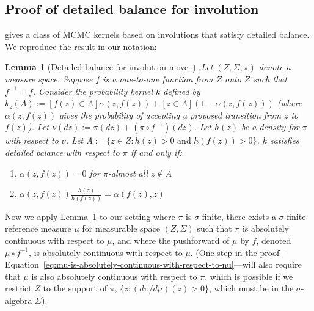 \documentclass[twoside]{article}
\newtheorem{lemma}[theorem]{Lemma}
\begin{document}
\subsection{Proof of detailed balance for involution} \label{sec:involution-detailed-balance}
\citet{tierney1998note} gives a class of MCMC kernels based on involutions that satisfy detailed balance.
We reproduce the result in our notation:
\begin{lemma}[Detailed balance for involution move~\citep{tierney1998note}] \label{lemma:tierney-involution}
Let $(Z, \Sigma, \pi)$ denote a measure space.
Suppose $f$ is a one-to-one function from $Z$ onto $Z$ such that $f^{-1} = f$.
Consider the probability kernel $k$ defined by $k_z(A) := [f(z) \in A] \alpha(z, f(z)) + [z \in A] (1 - \alpha(z, f(z)))$ (where $\alpha(z, f(z))$ gives the probability of accepting a proposed transition from $z$ to $f(z)$).
Let $\nu(dz) := \pi(dz) + (\pi \circ f^{-1})(dz)$.
Let $h(z)$ be a density for $\pi$ with respect to $\nu$.
Let $A := \{z \in Z : h(z) > 0 \mbox{ and } h(f(z)) > 0\}$.
$k$ satisfies detailed balance with respect to $\pi$ if and only if:
\begin{enumerate}
\item $\alpha(z, f(z)) = 0$ for $\pi$-almost all $z \not \in A$
\item $\alpha(z, f(z)) \frac{h(z)}{h(f(z))} = \alpha(f(z), z)$
\end{enumerate}
\end{lemma}

Now we apply Lemma~\ref{lemma:tierney-involution} to our setting where $\pi$ is $\sigma$-finite, there exists a $\sigma$-finite reference measure $\mu$ for measurable space $(Z, \Sigma)$ such that $\pi$ is absolutely continuous with respect to $\mu$, and where the pushforward of $\mu$ by $f$, denoted $\mu \circ f^{-1}$, is absolutely continuous with respect to $\mu$.
(One step in the proof---Equation~\ref{eq:mu-is-absolutely-continuous-with-respect-to-nu}---will also require that $\mu$ is also absolutely continuous with respect to $\pi$, which is possible if we restrict $Z$ to the support of $\pi$, $\{z : (d \pi / d \mu)(z) > 0\}$, which must be in the $\sigma$-algebra $\Sigma$).
\end{document}

